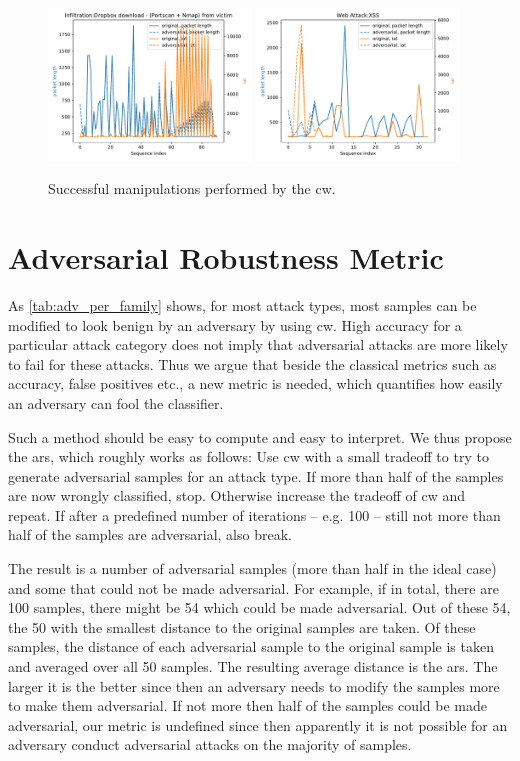 \documentclass[conference]{IEEEtran}
\begin{document}
\begin{figure}[p]
\includegraphics[width=0.48\textwidth]{../plots/plot_adv/5.pdf}
\includegraphics[width=0.48\textwidth]{../plots/plot_adv/6.pdf}
\caption{Successful manipulations performed by the \gls{cw}.}
\label{adv_plots}
\end{figure}

\section{Adversarial Robustness Metric}

As \autoref{tab:adv_per_family} shows, for most attack types, most samples can be modified to look benign by an adversary by using \gls{cw}. High accuracy for a particular attack category does not imply that adversarial attacks are more likely to fail for these attacks. Thus we argue that beside the classical metrics such as accuracy, false positives etc., a new metric is needed, which quantifies how easily an adversary can fool the classifier. 

Such a method should be easy to compute and easy to interpret. We thus propose the \gls{ars}, which roughly works as follows: Use \gls{cw} with a small tradeoff to try to generate adversarial samples for an attack type. If more than half of the samples are now wrongly classified, stop. Otherwise increase the tradeoff of \gls{cw} and repeat. If after a predefined number of iterations -- e.g. 100 -- still not more than half of the samples are adversarial, also break. 

The result is a number of adversarial samples (more than half in the ideal case) and some that could not be made adversarial. For example, if in total, there are 100 samples, there might be 54 which could be made adversarial. Out of these 54, the 50 with the smallest distance to the original samples are taken. Of these samples, the distance of each adversarial sample to the original sample is taken and averaged over all 50 samples. The resulting average distance is the \gls{ars}. The larger it is the better since then an adversary needs to modify the samples more to make them adversarial. If not more then half of the samples could be made adversarial, our metric is undefined since then apparently it is not possible for an adversary conduct adversarial attacks on the majority of samples.
\end{document}
